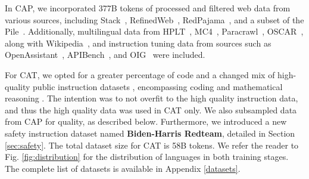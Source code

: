 

In CAP, we incorporated 377B tokens of processed and filtered web data from various sources, including Stack~\citep{kocetkov2022stack}, RefinedWeb~\citep{refinedweb}, RedPajama~\citep{together2023redpajama}, and a subset of the Pile~\citep{gao2020pile}. Additionally, multilingual data from HPLT~\citep{degibert2024new}, MC4~\citep{zhu2023multimodal}, Paracrawl~\citep{ghussin2023exploring}, OSCAR~\citep{abadji2022cleaner}, along with Wikipedia~\citep{wikidump}, and instruction tuning data from sources such as OpenAssistant~\citep{kopf2023openassistant}, APIBench~\citep{patil2023gorilla}, and OIG~\citep{oig2023} were included. 


For CAT, we opted for a greater percentage of code and a changed mix of high-quality public instruction datasets \citep{mishra2022crosstask, ding2023enhancing, ivison2023camels}, encompassing coding \citep{luo2023wizardcoder, mishra2023prompting} and mathematical reasoning \citep{yu2023metamath, mishra2023lila}. The intention was to not overfit to the high quality instruction data, and thus the high quality data was used in CAT only.  We also subsampled data from CAP for quality, as described below. Furthermore, we introduced a new safety instruction dataset named \textbf{Biden-Harris Redteam}, detailed in Section \ref{sec:safety}. The total dataset size for CAT is 58B tokens.
% 
We refer the reader to Fig. \ref{fig:distribution} for the distribution of languages in both training stages. The complete list of datasets is available in Appendix \ref{datasets}.

